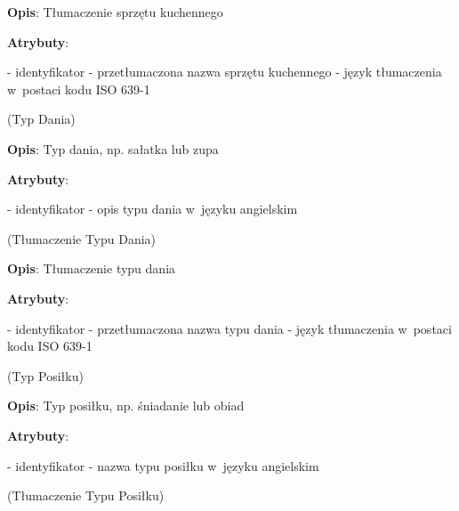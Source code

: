 \begin{enumerate}[label={\textbf{KAT/\protect\threedigits{\theenumi}}}, wide, labelwidth=!, labelindent=0pt, labelsep=0pt, series=reqs]
    \textbf{Opis}: Tłumaczenie sprzętu kuchennego
    \par
    \textbf{Atrybuty}:
    \begin{itemize}[series=atr, wide, align=left, leftmargin=190pt]
        \label{kat:KitchenApplianceTranslation:id}- identyfikator
        \label{kat:KitchenApplianceTranslation:translation}- przetłumaczona nazwa sprzętu kuchennego
        \label{kat:KitchenApplianceTranslation:language}- język tłumaczenia w~postaci kodu ISO 639-1
    \end{itemize}

    \label{kat:DishType} (Typ Dania)

    \textbf{Opis}: Typ dania, np. sałatka lub zupa
    \par
    \textbf{Atrybuty}:
    \begin{itemize}[series=atr, wide, align=left, leftmargin=190pt]
        \label{kat:DishType:id}- identyfikator
        \label{kat:DishType:description}- opis typu dania w~języku angielskim
    \end{itemize}

    \label{kat:DishTypeTranslation} (Tłumaczenie Typu Dania)

    \textbf{Opis}: Tłumaczenie typu dania
    \par
    \textbf{Atrybuty}:
    \begin{itemize}[series=atr, wide, align=left, leftmargin=190pt]
        \label{kat:DishTypeTranslation:id}- identyfikator
        \label{kat:DishTypeTranslation:translation}- przetłumaczona nazwa typu dania
        \label{kat:DishTypeTranslation:language}- język tłumaczenia w~postaci kodu ISO 639-1
    \end{itemize}

    \label{kat:MealType} (Typ Posiłku)

    \textbf{Opis}: Typ posiłku, np. śniadanie lub obiad
    \par
    \textbf{Atrybuty}:
    \begin{itemize}[series=atr, wide, align=left, leftmargin=190pt]
        \label{kat:MealType:id}- identyfikator
        \label{kat:MealType:name}- nazwa typu posiłku w~języku angielskim
    \end{itemize}

    \label{kat:MealTypeTranslation} (Tłumaczenie Typu Posiłku)


\end{enumerate}
